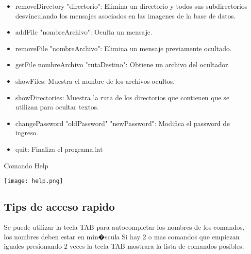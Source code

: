 \documentclass[12pt]{article}
\numberwithin{equation}{section}
\numberwithin{figure}{section}
\numberwithin{table}{section}
\begin{document}
\begin{itemize}
 \item  removeDirectory "directorio": Elimina un directorio y todos sus subdirectorios desvinculando los mensajes asociados en las imagenes de la base de datos.
\end{itemize}

\begin{itemize}
 \item  addFile "nombreArchivo": Oculta un mensaje.
\end{itemize}

\begin{itemize}
 \item  removeFile "nombreArchivo": Elimina un mensaje previamente ocultado.
\end{itemize}

\begin{itemize}
 \item  getFile nombreArchivo "rutaDestino": Obtiene un archivo del ocultador.
\end{itemize}

\begin{itemize}
 \item  showFiles: Muestra el nombre de los archivos ocultos.
\end{itemize}

\begin{itemize}
 \item  showDirectories: Muestra la ruta de los directorios que contienen que se utilizan para ocultar textos.
\end{itemize}

\begin{itemize}
 \item  changePassword "oldPassword" "newPassword": Modifica el password de ingreso.
\end{itemize}

\begin{itemize}
 \item  quit: Finaliza el programa.lat
\end{itemize}

\smallskip
\smallskip
\begin{center}
 Comando Help
\end{center}
\smallskip
\begin{center}
 \texttt{[image: help.png]}
\end{center}

\subsection{Tips de acceso rapido}
Se puede utilizar la tecla TAB para autocompletar los nombres de los comandos, los nombres deben estar en min�scula
Si hay 2 o mas comandos que empiezan iguales presionando 2 veces la tecla TAB mostrara la lista de comandos posibles.
\end{document}
